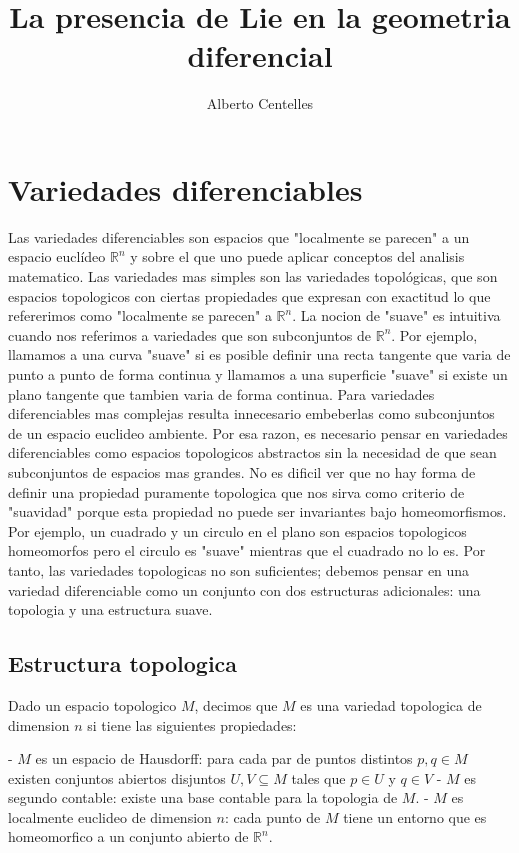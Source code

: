 \documentclass[12pt]{extarticle}
\title{La presencia de Lie en la geometria diferencial}
\author{Alberto Centelles}
\date{}
\newcommand{\<}{\langle}
\renewcommand{\>}{\rangle}
\theoremstyle{definition}
\begin{document}
\maketitle

\section{Variedades diferenciables}
Las variedades diferenciables son espacios que "localmente se parecen" a un espacio
euclídeo $\mathbb{R}^n$ y sobre el que uno puede aplicar conceptos del analisis matematico.
Las variedades mas simples son las variedades topológicas, que son
espacios topologicos con ciertas propiedades que expresan con exactitud lo que
refererimos como "localmente se parecen" a $\mathbb{R}^n$.
La nocion de "suave" es intuitiva cuando nos referimos a variedades que son
subconjuntos de $\mathbb{R}^n$. Por ejemplo, llamamos a una curva "suave" si es
posible definir una recta tangente que varia de punto a punto de forma continua
y llamamos a una superficie "suave" si existe un plano tangente que tambien
varia de forma continua.
Para variedades diferenciables mas complejas resulta innecesario embeberlas como
subconjuntos de un espacio euclideo ambiente. Por esa razon, es necesario pensar
en variedades diferenciables como espacios topologicos abstractos sin la necesidad de
que sean subconjuntos de espacios mas grandes.
No es dificil ver que no hay forma de definir una propiedad puramente topologica
que nos sirva como criterio de "suavidad" porque esta propiedad no puede ser
invariantes bajo homeomorfismos. Por ejemplo, un cuadrado y un circulo en el
plano son espacios topologicos homeomorfos pero el circulo es "suave" mientras
que el cuadrado no lo es. Por tanto, las variedades topologicas no son
suficientes; debemos pensar en una variedad diferenciable como un conjunto con dos
estructuras adicionales: una topologia y una estructura suave.

\subsection{Estructura topologica}
Dado un espacio topologico $M$, decimos que $M$ es una variedad topologica de
dimension $n$ si tiene las siguientes propiedades:

- $M$ es un espacio de Hausdorff: para cada par de puntos distintos $p, q \in M$
existen conjuntos abiertos disjuntos $U, V \subseteq M$ tales que $p \in U$ y
$q \in V$
- $M$ es segundo contable: existe una base contable para la topologia de $M$.
- $M$ es localmente euclideo de dimension $n$: cada punto de $M$ tiene un
entorno que es homeomorfico a un conjunto abierto de $\mathbb{R}^n$.
\end{document}
